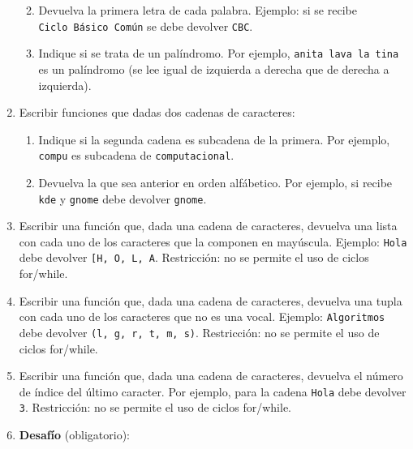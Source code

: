 \documentclass[
  letterpaper,
  DIV=11,
  numbers=noendperiod]{scrreprt}
\providecommand{\tightlist}{%
  \setlength{\itemsep}{0pt}\setlength{\parskip}{0pt}}\usepackage{longtable,booktabs,array}
\begin{document}
\begin{enumerate}
  \begin{enumerate}
  \def\labelenumii{\alph{enumii}.}
  \tightlist
  \item
    Devuelva la primera letra de cada palabra. Ejemplo: si se recibe
    \texttt{Ciclo\ Básico\ Común} se debe devolver \texttt{CBC}.
  \item
    Indique si se trata de un palíndromo. Por ejemplo,
    \texttt{anita\ lava\ la\ tina} es un palíndromo (se lee igual de
    izquierda a derecha que de derecha a izquierda).
  \end{enumerate}
\item
  Escribir funciones que dadas dos cadenas de caracteres:

  \begin{enumerate}
  \def\labelenumii{\alph{enumii}.}
  \tightlist
  \item
    Indique si la segunda cadena es subcadena de la primera. Por
    ejemplo, \texttt{\textquotesingle{}compu\textquotesingle{}} es
    subcadena de
    \texttt{\textquotesingle{}computacional\textquotesingle{}}.
  \item
    Devuelva la que sea anterior en orden alfábetico. Por ejemplo, si
    recibe \texttt{\textquotesingle{}kde\textquotesingle{}} y
    \texttt{\textquotesingle{}gnome\textquotesingle{}} debe devolver
    \texttt{\textquotesingle{}gnome\textquotesingle{}}.
  \end{enumerate}
\item
  Escribir una función que, dada una cadena de caracteres, devuelva una
  lista con cada uno de los caracteres que la componen en mayúscula.
  Ejemplo: \texttt{\textquotesingle{}Hola\textquotesingle{}} debe
  devolver
  \texttt{{[}\textquotesingle{}H\textquotesingle{},\ \textquotesingle{}O\textquotesingle{},\ \textquotesingle{}L\textquotesingle{},\ \textquotesingle{}A\textquotesingle{}{]}}.
  Restricción: no se permite el uso de ciclos for/while.
\item
  Escribir una función que, dada una cadena de caracteres, devuelva una
  tupla con cada uno de los caracteres que no es una vocal. Ejemplo:
  \texttt{\textquotesingle{}Algoritmos\textquotesingle{}} debe devolver
  \texttt{(\textquotesingle{}l\textquotesingle{},\ \textquotesingle{}g\textquotesingle{},\ \textquotesingle{}r\textquotesingle{},\ \textquotesingle{}t\textquotesingle{},\ \textquotesingle{}m\textquotesingle{},\ \textquotesingle{}s\textquotesingle{})}.
  Restricción: no se permite el uso de ciclos for/while.
\item
  Escribir una función que, dada una cadena de caracteres, devuelva el
  número de índice del último caracter. Por ejemplo, para la cadena
  \texttt{\textquotesingle{}Hola\textquotesingle{}} debe devolver
  \texttt{3}. Restricción: no se permite el uso de ciclos for/while.
\item
  \textbf{Desafío} (obligatorio):


\end{enumerate}
\end{document}
